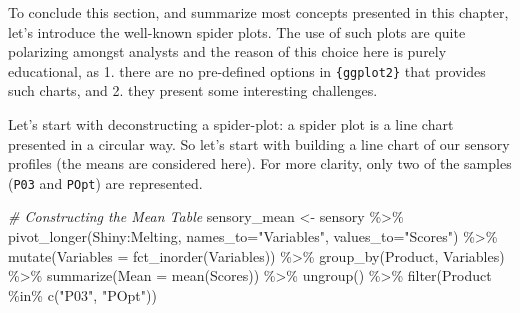 \documentclass[
]{book}
\newenvironment{Shaded}{\begin{snugshade}}{\end{snugshade}}
\newcommand{\AttributeTok}[1]{\textcolor[rgb]{0.77,0.63,0.00}{#1}}
\newcommand{\CommentTok}[1]{\textcolor[rgb]{0.56,0.35,0.01}{\textit{#1}}}
\newcommand{\FunctionTok}[1]{\textcolor[rgb]{0.00,0.00,0.00}{#1}}
\newcommand{\NormalTok}[1]{#1}
\newcommand{\OtherTok}[1]{\textcolor[rgb]{0.56,0.35,0.01}{#1}}
\newcommand{\SpecialCharTok}[1]{\textcolor[rgb]{0.00,0.00,0.00}{#1}}
\newcommand{\StringTok}[1]{\textcolor[rgb]{0.31,0.60,0.02}{#1}}
\begin{document}
To conclude this section, and summarize most concepts presented in this chapter, let's introduce the well-known spider plots. The use of such plots are quite polarizing amongst analysts and the reason of this choice here is purely educational, as 1. there are no pre-defined options in \texttt{\{ggplot2\}} that provides such charts, and 2. they present some interesting challenges.

Let's start with deconstructing a spider-plot: a spider plot is a line chart presented in a circular way. So let's start with building a line chart of our sensory profiles (the means are considered here). For more clarity, only two of the samples (\texttt{P03} and \texttt{POpt}) are represented.

\begin{Shaded}
\begin{Highlighting}[]
\CommentTok{\# Constructing the Mean Table}
\NormalTok{sensory\_mean }\OtherTok{\textless{}{-}}\NormalTok{ sensory }\SpecialCharTok{\%\textgreater{}\%} 
  \FunctionTok{pivot\_longer}\NormalTok{(Shiny}\SpecialCharTok{:}\NormalTok{Melting, }\AttributeTok{names\_to=}\StringTok{"Variables"}\NormalTok{, }\AttributeTok{values\_to=}\StringTok{"Scores"}\NormalTok{) }\SpecialCharTok{\%\textgreater{}\%} 
  \FunctionTok{mutate}\NormalTok{(}\AttributeTok{Variables =} \FunctionTok{fct\_inorder}\NormalTok{(Variables)) }\SpecialCharTok{\%\textgreater{}\%} 
  \FunctionTok{group\_by}\NormalTok{(Product, Variables) }\SpecialCharTok{\%\textgreater{}\%} 
  \FunctionTok{summarize}\NormalTok{(}\AttributeTok{Mean =} \FunctionTok{mean}\NormalTok{(Scores)) }\SpecialCharTok{\%\textgreater{}\%} 
  \FunctionTok{ungroup}\NormalTok{() }\SpecialCharTok{\%\textgreater{}\%} 
  \FunctionTok{filter}\NormalTok{(Product }\SpecialCharTok{\%in\%} \FunctionTok{c}\NormalTok{(}\StringTok{"P03"}\NormalTok{, }\StringTok{"POpt"}\NormalTok{))}


\end{Highlighting}
\end{Shaded}
\end{document}
